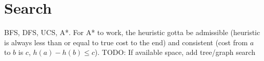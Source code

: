 \section{Search}
BFS, DFS, UCS, A*. For A* to work, the heuristic gotta be admissible (heuristic is always less than or equal to true cost to the end) and consistent (cost from $a$ to $b$ is $c$, $h(a) - h(b) \leq c$). TODO: If available space, add tree/graph search